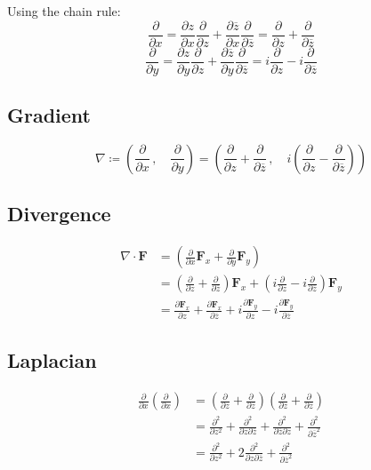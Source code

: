 Using the chain rule:
\[ 
\frac{\partial}{\partial x} = \frac{\partial z}{\partial x} \frac{\partial}{\partial z} + \frac{\partial \overline{z}}{\partial x} \frac{\partial}{\partial \overline{z}} = \frac{\partial}{\partial z} + \frac{\partial}{\partial \overline{z}} 
\]
\[ 
\frac{\partial}{\partial y} = \frac{\partial z}{\partial y} \frac{\partial}{\partial z} + \frac{\partial \overline{z}}{\partial y} \frac{\partial}{\partial \overline{z}} = i \frac{\partial}{\partial z} - i \frac{\partial}{\partial \overline{z}} 
\]


\subsection{Gradient}
\[ 
\nabla \coloneqq\left(\frac{\partial}{\partial x}\,,\quad \frac{\partial}{\partial y}\right)= \left( \frac{\partial}{\partial z} + \frac{\partial}{\partial \overline{z}}\,, \quad i \left( \frac{\partial}{\partial z} - \frac{\partial}{\partial \overline{z}} \right) \right) 
\]

\subsection{Divergence}

\begin{equation*}
\begin{split}
\nabla \cdot \mathbf{F} &= \left( \frac{\partial}{\partial x} \mathbf{F}_x + \frac{\partial}{\partial y} \mathbf{F}_y \right) \\
&= \left( \frac{\partial}{\partial z} + \frac{\partial}{\partial \overline{z}} \right) \mathbf{F}_x + \left( i \frac{\partial}{\partial z} - i \frac{\partial}{\partial \overline{z}} \right) \mathbf{F}_y \\
&= \frac{\partial \mathbf{F}_x}{\partial z} + \frac{\partial \mathbf{F}_x}{\partial \overline{z}} + i \frac{\partial \mathbf{F}_y}{\partial z} - i \frac{\partial \mathbf{F}_y}{\partial \overline{z}}
\end{split}
\end{equation*}

\subsection{Laplacian}

\begin{equation*}
\begin{split}
\frac{\partial}{\partial x} \left( \frac{\partial}{\partial x} \right) &= \left( \frac{\partial}{\partial z} + \frac{\partial}{\partial \overline{z}} \right) \left( \frac{\partial}{\partial z} + \frac{\partial}{\partial \overline{z}} \right) \\
&= \frac{\partial^2}{\partial z^2} + \frac{\partial^2}{\partial z \partial \overline{z}} + \frac{\partial^2}{\partial \overline{z} \partial z} + \frac{\partial^2}{\partial \overline{z}^2} \\
&= \frac{\partial^2}{\partial z^2} + 2 \frac{\partial^2}{\partial z \partial \overline{z}} + \frac{\partial^2}{\partial \overline{z}^2}
\end{split}
\end{equation*}

